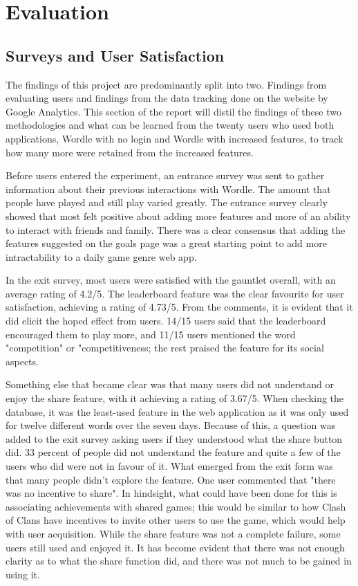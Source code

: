 
\chapter{Evaluation}
\section{Surveys and User Satisfaction}
The findings of this project are predominantly split into two. Findings from evaluating users and findings from the data tracking done on the website by Google Analytics. This section of the report will distil the findings of these two methodologies and what can be learned from the twenty users who used both applications, Wordle with no login and Wordle with increased features, to track how many more were retained from the increased features. 

Before users entered the experiment, an entrance survey was sent to gather information about their previous interactions with Wordle. The amount that people have played and still play varied greatly. The entrance survey clearly showed that most felt positive about adding more features and more of an ability to interact with friends and family. There was a clear consensus that adding the features suggested on the goals page was a great starting point to add more intractability to a daily game genre web app. 

In the exit survey, most users were satisfied with the gauntlet overall, with an average rating of 4.2/5. The leaderboard feature was the clear favourite for user satisfaction, achieving a rating of 4.73/5. From the comments, it is evident that it did elicit the hoped effect from users. 14/15 users said that the leaderboard encouraged them to play more, and 11/15 users mentioned the word "competition" or "competitiveness; the rest praised the feature for its social aspects.

Something else that became clear was that many users did not understand or enjoy the share feature, with it achieving a rating of 3.67/5. When checking the database, it was the least-used feature in the web application as it was only used for twelve different words over the seven days. Because of this, a question was added to the exit survey asking users if they understood what the share button did. 33 percent of people did not understand the feature and quite a few of the users who did were not in favour of it. What emerged from the exit form was that many people didn't explore the feature. One user commented that "there was no incentive to share". In hindsight, what could have been done for this is associating achievements with shared games; this would be similar to how Clash of Clans have incentives to invite other users to use the game, which would help with user acquisition. While the share feature was not a complete failure, some users still used and enjoyed it. It has become evident that there was not enough clarity as to what the share function did, and there was not much to be gained in using it. 


